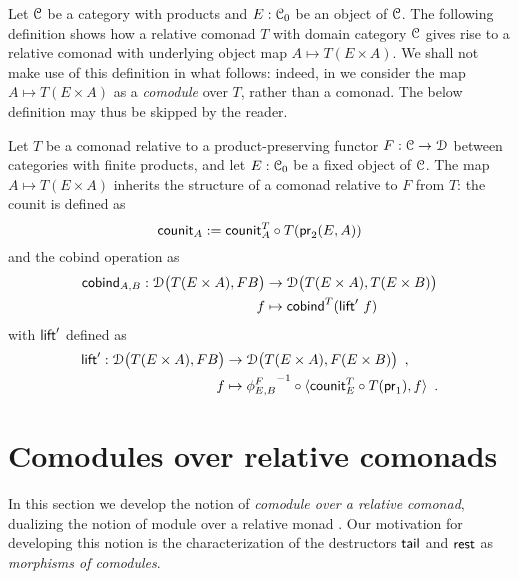 \documentclass[a4paper,USenglish]{lipics}
\newcommand{\parencite}[1]{\cite{#1}}
\begin{document}
Let $\C$ be a category with products and $E:\C_0$ be an object of $\C$.
The following definition shows how a relative comonad $T$ with domain category $\C$ gives rise to a relative comonad with underlying object map
$A \mapsto T(E\times A)$.
We shall not make use of this definition in what follows: indeed, in  we consider the map $A\mapsto T(E\times A)$
as a \emph{comodule} over $T$, rather than a comonad. The below definition may thus be skipped by the reader.

\begin{defn}\label{product_comonad}
  Let $T$ be a comonad relative to a product-preserving functor $F:\C\to\D$ between categories with finite products,
  and let $E:\C_0$ be a fixed object of $\C$.
 The map $A\mapsto T(E\times A)$ inherits the structure of a comonad relative to $F$ from $T$: the 
 counit is defined as
   \[ \counit_A := \comp{T(\pr_2(E,A))}{\counit^T_{A}} \]
  and the cobind operation as
   \begin{align*} 
            \cobind_{A,B} : \D\bigl(T(E\times A),FB\bigr) &\to \D\bigl(T(E\times A),T(E\times B)\bigr) \\
              f &\mapsto  \cobind^T(\extend'~f)
   \end{align*}
  with $\extend'$ defined as 
  \begin{align*} \extend' : \D\bigl(T(E\times A),FB\bigr) &\to \D\bigl(T(E\times A), F(E\times B)\bigr) \enspace , \\ 
                                            f & \mapsto \comp{\langle \comp{T(\pr_1)}{\counit^T_E}, f \rangle}{{\phi^{F}_{E,B}}^{-1}} \enspace .
  \end{align*}
\end{defn}




\section{Comodules over relative comonads}\label{sec:comodules}

In this section we develop the notion of \emph{comodule over a relative comonad}, dualizing the notion of module over a relative monad \parencite{ahrens_relmonads}.
Our motivation for developing this notion is the characterization of the destructors $\stail$ and $\tail$ as \emph{morphisms of comodules}.
\end{document}
